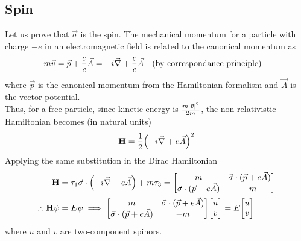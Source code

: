\documentclass[12pt,a4paper,titlepage]{article}
\begin{document}
\subsection{Spin}
Let us prove that $\vec{\sigma}$ is the spin. The mechanical momentum for a particle with charge $-e$ in an electromagnetic field is related to the canonical momentum as
\begin{equation}
m\vec{v}=\vec{p}+\frac{e}{c}\vec{A}=-i\vec{\nabla}+\frac{e}{c}\vec{A}\qq{(by correspondance principle)}
\end{equation}
where $\vec{p}$ is the canonical momentum from the Hamiltonian formalism and $\vec{A}$ is the vector potential.\\

Thus, for a free particle, since kinetic energy is $\frac{m\abs*{\vec{v}}^{2}}{2m}$, the non-relativistic Hamiltonian becomes (in natural units)
\begin{equation}
\vb{H}=\frac{1}{2}\qty(-i\vec{\nabla}+e\vec{A})^{2}
\end{equation}
Applying the same substitution in the Dirac Hamiltonian
\begin{equation}
\begin{aligned}
\vb{H}&=\tau_{1}\vec{\sigma}\cdot\qty(-i\vec{\nabla}+e\vec{A})+m\tau_{3}=\mqty[m & \vec{\sigma}\cdot(\vec{p}+e\vec{A}) \\ \vec{\sigma}\cdot(\vec{p}+e\vec{A}) & -m]\\
\therefore\vb{H}\psi&=E\psi\implies\mqty[m & \vec{\sigma}\cdot(\vec{p}+e\vec{A}) \\ \vec{\sigma}\cdot(\vec{p}+e\vec{A}) & -m]\mqty[u \\ v] =E\mqty[u \\ v]
\end{aligned}
\end{equation}
where $u$ and $v$ are two-component spinors.\\
\end{document}
